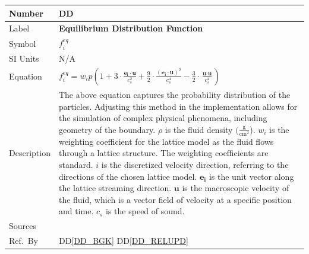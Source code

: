 \documentclass[12pt]{article}
\newcommand{\colAwidth}{0.13\textwidth}
\newcommand{\colBwidth}{0.82\textwidth}
\newcounter{defnum} %
\newcounter{datadefnum} %
\begin{document}
\noindent
\begin{minipage}{\textwidth}
	\renewcommand*{\arraystretch}{1.5}
	\begin{tabular}{| p{\colAwidth} | p{\colBwidth}|}
		\hline
		\rowcolor[gray]{0.9}
		Number& DD{datadefnum}\thedatadefnum 
		\label{DD_EDF}\\
		\hline
		Label& \bf Equilibrium Distribution Function\\
		\hline
		Symbol &$f_{i}^{eq}$\\
		\hline
		SI Units & N/A \\
		\hline
		Equation& $f_{i}^{eq} = w_{i}p(1 + 3 \cdot \frac{\textbf{e}_\textbf{i}\cdot\textbf{u}}{c_s^2}+\frac{9}{2} \cdot \frac{(\textbf{e}_\textbf{i}\cdot\textbf{u})^2}{c_s^4}-\frac{3}{2} \cdot \frac{\textbf{u}\cdot\textbf{u}}{c_s^4})$ \\
		\hline
		Description &
		The above equation captures the probability distribution of the
		particles. Adjusting this method in the implementation allows
		for the simulation of complex physical phenomena, including
		geometry of the boundary.
		$\rho$ is the fluid density $(\mathrm{\frac{g}{cm^2}}$). $w_{i}$ is the weighting
		coefficient for the lattice model as the fluid flows through a
		lattice structure. The weighting coefficients are standard. $i$
		is the discretized velocity direction, referring to the
		directions of the chosen lattice model. $\textbf{e}_\textbf{i}$ is the
		unit vector along the lattice streaming direction. $\textbf{u}$
		is the macroscopic velocity of the fluid, which is a vector
		field of velocity at a specific position and
		time. ${c_s}$ is the speed of sound. %
		\\
		\hline
		Sources&  \citet{lbmbolton} \newline \citet{gibiansky} \newline \citet{mohamad2011lattice}\\
		\hline
		Ref.\ By & DD\ref{DD_BGK} DD\ref{DD_RELUPD}\\
		\hline
	\end{tabular}
\end{minipage}\\
\end{document}
